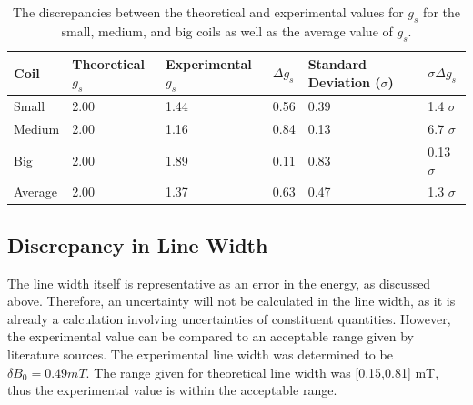 \documentclass[a4paper]{article}
\begin{document}
\begin{table}[H]
  \caption{The discrepancies between the theoretical and experimental values for
    \( g_s \) for the small, medium, and big coils as well as the average value
    of \( g_s \).}
  \begin{center}
    \begin{tabular}{|l|l|l|l|l|l|}
      \hline
      Coil & Theoretical \( g_s \) & Experimental \( g_s \) & \( \Delta g_s \) &
                                                                                 Standard
                                                                                 Deviation
                                                                                 (\(
                                                                                 \sigma
                                                                                 \)) &
                                                                                 \(
                                                                                 \sigma
                                                                                 \Delta
                                                                                 g_s
                                                                                 \)
      \\
      \hline
      Small & 2.00 & 1.44 & 0.56 & 0.39 & 1.4 \( \sigma \) \\
      Medium & 2.00 & 1.16 & 0.84 & 0.13 & 6.7 \( \sigma \) \\
      Big & 2.00 & 1.89 & 0.11 & 0.83 & 0.13 \( \sigma \) \\
      \hline
      Average & 2.00 & 1.37 & 0.63 & 0.47 & 1.3 \( \sigma \) \\
      \hline
    \end{tabular}
  \end{center}
  \label{tab:discrepancyG}
\end{table}


\subsection{Discrepancy in Line Width}
\qq The line width itself is representative as an error in the energy,
as discussed above. Therefore, an uncertainty will not be calculated
in the line width, as it is already a calculation involving
uncertainties of constituent quantities. However, the experimental
value can be compared to an acceptable range given by literature
sources. The experimental line width was determined to be $\delta B_0
= 0.49 mT$. The range given for theoretical line width was [0.15,0.81]
mT, thus the experimental value is within the acceptable range.
\end{document}
